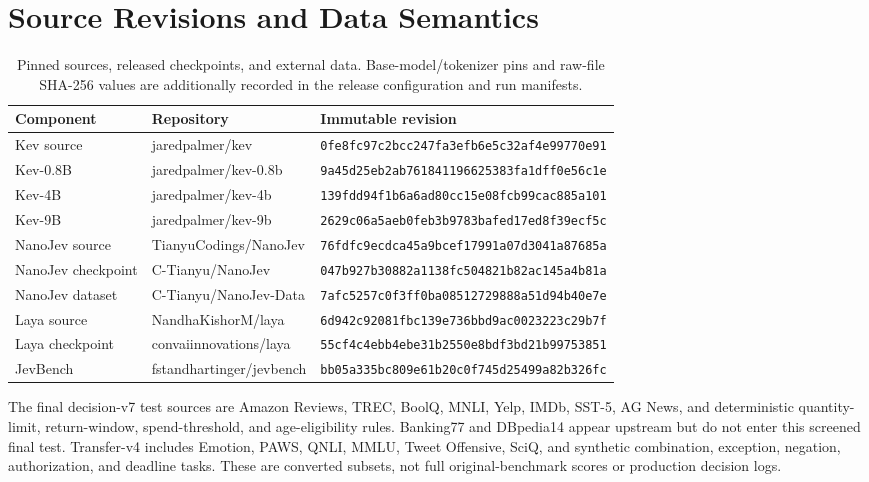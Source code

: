 \documentclass[10pt,twocolumn]{article}
\begin{document}
\section{Source Revisions and Data Semantics}
\label{app:pins}
\begin{table}[t]
\centering\scriptsize
\begin{tabular}{lll}
\toprule
Component & Repository & Immutable revision\\
\midrule
Kev source & jaredpalmer/kev & \texttt{0fe8fc97c2bcc247fa3efb6e5c32af4e99770e91}\\
Kev-0.8B & jaredpalmer/kev-0.8b & \texttt{9a45d25eb2ab761841196625383fa1dff0e56c1e}\\
Kev-4B & jaredpalmer/kev-4b & \texttt{139fdd94f1b6a6ad80cc15e08fcb99cac885a101}\\
Kev-9B & jaredpalmer/kev-9b & \texttt{2629c06a5aeb0feb3b9783bafed17ed8f39ecf5c}\\
NanoJev source & TianyuCodings/NanoJev & \texttt{76fdfc9ecdca45a9bcef17991a07d3041a87685a}\\
NanoJev checkpoint & C-Tianyu/NanoJev & \texttt{047b927b30882a1138fc504821b82ac145a4b81a}\\
NanoJev dataset & C-Tianyu/NanoJev-Data & \texttt{7afc5257c0f3ff0ba08512729888a51d94b40e7e}\\
Laya source & NandhaKishorM/laya & \texttt{6d942c92081fbc139e736bbd9ac0023223c29b7f}\\
Laya checkpoint & convaiinnovations/laya & \texttt{55cf4c4ebb4ebe31b2550e8bdf3bd21b99753851}\\
JevBench & fstandhartinger/jevbench & \texttt{bb05a335bc809e61b20c0f745d25499a82b326fc}\\
\bottomrule
\end{tabular}
\caption{Pinned sources, released checkpoints, and external data.
Base-model/tokenizer pins and raw-file SHA-256 values are additionally
recorded in the release configuration and run manifests.}
\end{table}

The final decision-v7 test sources are Amazon Reviews, TREC, BoolQ,
MNLI, Yelp, IMDb, SST-5, AG News, and deterministic quantity-limit,
return-window, spend-threshold, and age-eligibility rules.
Banking77 and DBpedia14 appear upstream but do not enter this
screened final test. Transfer-v4 includes Emotion, PAWS, QNLI,
MMLU, Tweet Offensive, SciQ, and synthetic combination, exception,
negation, authorization, and deadline tasks. These are converted
subsets, not full original-benchmark scores or production decision logs.
\end{document}
